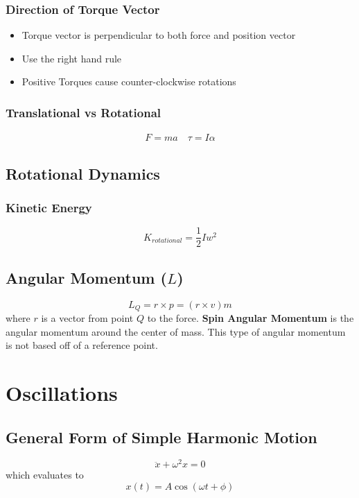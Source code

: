 \documentclass[../Notes.tex]{subfiles}
\begin{document}
    \subsubsection{Direction of Torque Vector}
    \begin{itemize}
        \item Torque vector is perpendicular to both force and position vector
        \item Use the right hand rule
        \item Positive Torques cause counter-clockwise rotations 
    \end{itemize}
    \subsubsection{Translational vs Rotational}
    \begin{align*}
        F = m a \quad
        \tau = I \alpha
    \end{align*}

    \subsection{Rotational Dynamics}
    \subsubsection{Kinetic Energy}
    \begin{equation*}
        K_{rotational} = \frac12 I w^2
    \end{equation*}

    \subsection{Angular Momentum ($L$)}
    \begin{equation*}
        L_Q = r \times p = (r \times v)m
    \end{equation*}
    where $r$ is a vector from point $Q$ to the force. \newline
    \textbf{Spin Angular Momentum} is the angular momentum around the center of mass.
    This type of angular momentum is not based off of a reference point.

    \section{Oscillations}
    \subsection{General Form of Simple Harmonic Motion}
    \begin{equation*}
        \ddot x + \omega^2 x = 0
    \end{equation*}
    which evaluates to 
    \begin{equation*}
        x(t) = A \cos(\omega t + \phi)
    \end{equation*}
\end{document}
